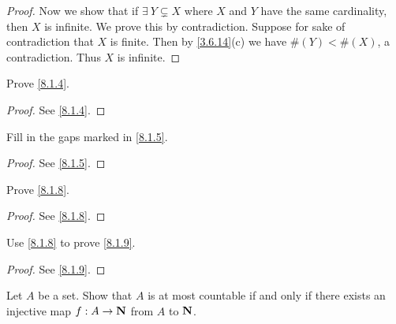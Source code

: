 \begin{proof}
  Now we show that if \(\exists\ Y \subsetneq X\) where \(X\) and \(Y\) have the same cardinality, then \(X\) is infinite.
  We prove this by contradiction.
  Suppose for sake of contradiction that \(X\) is finite.
  Then by \cref{3.6.14}(c) we have \(\#(Y) < \#(X)\), a contradiction.
  Thus \(X\) is infinite.
\end{proof}

\begin{exercise}\label{ex 8.1.2}
  Prove \cref{8.1.4}.
\end{exercise}

\begin{proof}
  See \cref{8.1.4}.
\end{proof}

\begin{exercise}\label{ex 8.1.3}
  Fill in the gaps marked in \cref{8.1.5}.
\end{exercise}

\begin{proof}
  See \cref{8.1.5}.
\end{proof}

\begin{exercise}\label{ex 8.1.4}
  Prove \cref{8.1.8}.
\end{exercise}

\begin{proof}
  See \cref{8.1.8}.
\end{proof}

\begin{exercise}\label{ex 8.1.5}
  Use \cref{8.1.8} to prove \cref{8.1.9}.
\end{exercise}

\begin{proof}
  See \cref{8.1.9}.
\end{proof}

\begin{exercise}\label{ex 8.1.6}
  Let \(A\) be a set.
  Show that \(A\) is at most countable if and only if there exists an injective map \(f : A \to \mathbf{N}\) from \(A\) to \(\mathbf{N}\).
\end{exercise}

